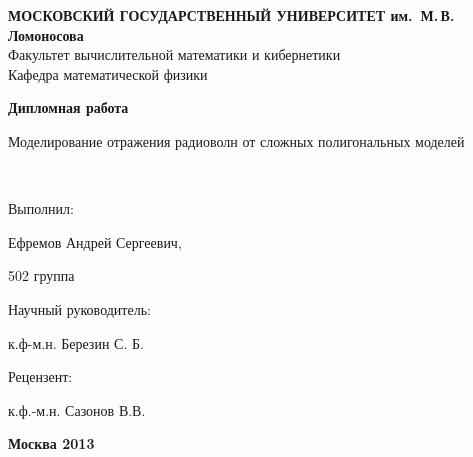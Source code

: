 \documentclass{scrartcl}
\begin{document}
\thispagestyle{empty} 
\begin{center}
{\bfseries МОСКОВСКИЙ ГОСУДАРСТВЕННЫЙ УНИВЕРСИТЕТ им.~М.{\,}В.{\,}Ломоносова}\\
\vspace{2ex}Факультет вычислительной математики и кибернетики\\
\vspace{2ex}Кафедра математической физики
\end{center}


\vfill

\begin{center}
{\huge {\bfseries Дипломная работа

\vspace*{1cm}

Моделирование отражения радиоволн от сложных полигональных моделей}\\[25mm] }

\end{center}

\vfill

\hspace*{7cm} Выполнил:

\hspace*{7cm} Ефремов Андрей Сергеевич,

\hspace*{7cm} 502 группа

\hspace*{7cm} Научный руководитель:

\hspace*{7cm} к.ф-м.н. Березин С. Б.

\hspace*{7cm} Рецензент:

\hspace*{7cm} к.ф.-м.н. Сазонов В.В.
\bigskip

\vfill

\begin{center}
{\bfseries Москва 2013}
\end{center}


  
  
  
  
  
  
  
  
  
  
\end{document}

